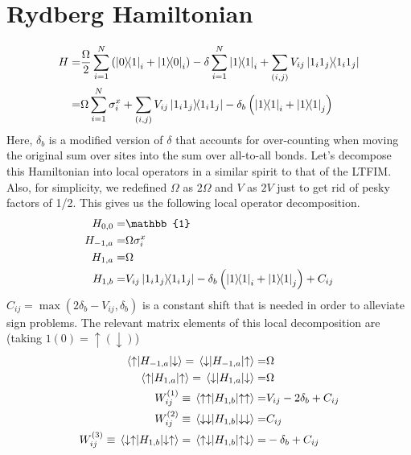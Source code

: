 \documentclass[12pt]{article}
\begin{document}
\section{Rydberg Hamiltonian}

\begin{align*}
    H =& \frac{\Omega}{2} \sum_{i=1}^N \left( \ketbra{0}{1}_i + \ketbra{1}{0}_i \right) - \delta \sum_{i=1}^N \ketbra{1}{1}_i + \sum_{(i,j)} V_{ij} \ketbra{1_i 1_j}{1_i 1_j} \\
    =& \Omega \sum_{i=1}^N \sigma_i^x + \sum_{(i,j)} V_{ij} \ketbra{1_i 1_j}{1_i 1_j} - \delta_b \left(\ketbra{1}{1}_i + \ketbra{1}{1}_j\right)
\end{align*}
Here, $\delta_b$ is a modified version of $\delta$ that accounts for over-counting when moving the original sum over sites into the sum over all-to-all bonds.
Let's decompose this Hamiltonian into local operators in a similar spirit to that of the LTFIM. 
Also, for simplicity, we redefined $\Omega$ as $2\Omega$ and $V$ as $2V$ just to get rid of pesky factors of 1/2.
This gives us the following local operator decomposition.
\begin{subequations} \label{eq:decomposition_ryd}
    \begin{align}
        H_{0,0} =& \mathbb{1} \\
        H_{-1,a} =& \Omega \sigma_i^x \\
        H_{1,a} =& \Omega \\
        H_{1,b} =& V_{ij} \ketbra{1_i 1_j}{1_i 1_j} - \delta_b \left(\ketbra{1}{1}_i + \ketbra{1}{1}_j\right) + C_{ij}
    \end{align}
\end{subequations}
$C_{ij} = \max(2\delta_b - V_{ij}, \delta_b)$ is a constant shift that is needed in order to alleviate sign problems.
The relevant matrix elements of this local decomposition are (taking $1 (0) = \uparrow (\downarrow)$)
\begin{subequations} \label{eq:mat_elems_ryd}
    \begin{align}
        \matrixel{\uparrow}{H_{-1,a}}{\downarrow} = \matrixel{\downarrow}{H_{-1,a}}{\uparrow} =& \Omega \\
        \matrixel{\uparrow}{H_{1,a}}{\uparrow} = \matrixel{\downarrow}{H_{1,a}}{\downarrow} =& \Omega \\
        W_{ij}^{(1)} \equiv \matrixel{\uparrow \uparrow}{H_{1,b}}{\uparrow \uparrow} =& V_{ij} - 2\delta_b + C_{ij} \\
        W_{ij}^{(2)} \equiv \matrixel{\downarrow \downarrow}{H_{1,b}}{\downarrow \downarrow} =& C_{ij}\\
        W_{ij}^{(3)} \equiv \matrixel{\downarrow \uparrow}{H_{1,b}}{\downarrow \uparrow} = \matrixel{\uparrow \downarrow}{H_{1,b}}{\uparrow \downarrow} =& -\delta_b + C_{ij}
    \end{align}
\end{subequations}
\end{document}
